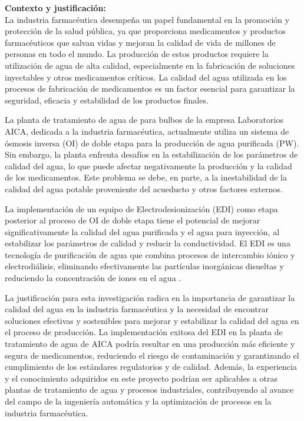 \textbf{Contexto y justificación:}\\
La industria farmacéutica desempeña un papel fundamental en la promoción y protección de la salud pública, 
ya que proporciona medicamentos y productos farmacéuticos que salvan vidas y mejoran la calidad de vida 
de millones de personas en todo el mundo. La producción de estos productos requiere la utilización de 
agua de alta calidad, especialmente en la fabricación de soluciones inyectables y otros medicamentos 
críticos. La calidad del agua utilizada en los procesos de fabricación de medicamentos es un factor 
esencial para garantizar la seguridad, eficacia y estabilidad de los productos finales.

La planta de tratamiento de agua de para bulbos de la empresa Laboratorios AICA, dedicada a la
 industria farmacéutica, actualmente utiliza un sistema de ósmosis inversa (OI) de doble etapa 
 para la producción de agua purificada (PW). Sin embargo, la planta enfrenta desafíos en la 
 estabilización de los parámetros de calidad del agua, lo que puede afectar negativamente la 
 producción y la calidad de los medicamentos. Este problema se debe, en parte, a la inestabilidad 
 de la calidad del agua potable proveniente del acueducto y otros factores externos.

La implementación de un equipo de Electrodesionización (EDI) como etapa posterior al proceso de OI 
de doble etapa tiene el potencial de mejorar significativamente la calidad del agua purificada y el
 agua para inyección, al estabilizar los parámetros de calidad y reducir la conductividad. El EDI 
 es una tecnología de purificación de agua que combina procesos de intercambio iónico y 
 electrodiálisis, eliminando efectivamente las partículas inorgánicas disueltas y reduciendo 
 la concentración de iones en el agua \cite{alvaradoElectrodeionizationPrinciplesStrategies2014}.

La justificación para esta investigación radica en la importancia de garantizar la calidad del agua 
en la industria farmacéutica y la necesidad de encontrar soluciones efectivas y sostenibles para 
mejorar y estabilizar la calidad del agua en el proceso de producción. La implementación exitosa 
del EDI en la planta de tratamiento de agua de AICA podría resultar en una producción más eficiente 
y segura de medicamentos, reduciendo el riesgo de contaminación y garantizando el cumplimiento de los 
estándares regulatorios y de calidad. Además, la experiencia y el conocimiento adquiridos en este proyecto 
podrían ser aplicables a otras plantas de tratamiento de agua y procesos industriales, contribuyendo al avance
 del campo de la ingeniería automática y la optimización de procesos en la industria farmacéutica.

